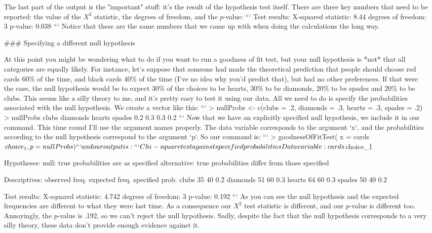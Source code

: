 The last part of the output is the "important" stuff: it's the result of the hypothesis test itself. There are three key numbers that need to be reported: the value of the $X^2$ statistic, the degrees of freedom, and the $p$-value:
```
Test results: 
   X-squared statistic:  8.44 
   degrees of freedom:  3 
   p-value:  0.038 
```
Notice that these are the same numbers that we came up with when doing the calculations the long way.

### Specifying a different null hypothesis

At this point you might be wondering what to do if you want to run a goodness of fit test, but your null hypothesis is *not* that all categories are equally likely. For instance, let's suppose that someone had made the theoretical prediction that people should choose red cards 60\% of the time, and black cards 40\% of the time (I've no idea why you'd predict that), but had no other preferences. If that were the case, the null hypothesis would be to expect 30\% of the choices to be hearts, 30\% to be diamonds, 20\% to be spades and 20\% to be clubs. This seems like a silly theory to me, and it's pretty easy to test it using our data. All we need to do is specify the probabilities associated with the null hypothesis. We create a vector like this:
```
> nullProbs <- c(clubs = .2, diamonds = .3, hearts = .3, spades = .2)
> nullProbs
   clubs diamonds   hearts   spades 
     0.2      0.3      0.3      0.2 
```
Now that we have an explicitly specified null hypothesis, we include it in our command. This time round I'll use the argument names properly. The data variable corresponds to the argument `x`, and the probabilities according to the null hypothesis correspond to the argument `p`. So our command is:
```
> goodnessOfFitTest( x = cards$choice_1, p = nullProbs )
```
and our output is:
```
     Chi-square test against specified probabilities

Data variable:   cards$choice_1 

Hypotheses: 
   null:        true probabilities are as specified
   alternative: true probabilities differ from those specified

Descriptives: 
         observed freq. expected freq. specified prob.
clubs                35             40             0.2
diamonds             51             60             0.3
hearts               64             60             0.3
spades               50             40             0.2

Test results: 
   X-squared statistic:  4.742 
   degrees of freedom:  3 
   p-value:  0.192 
```
As you can see the null hypothesis and the expected frequencies are different to what they were last time. As a consequence our $X^2$ test statistic is different, and our $p$-value is different too. Annoyingly, the $p$-value is .192, so we can't reject the null hypothesis. Sadly, despite the fact that the null hypothesis corresponds to a very silly theory, these data don't provide enough evidence against it.



